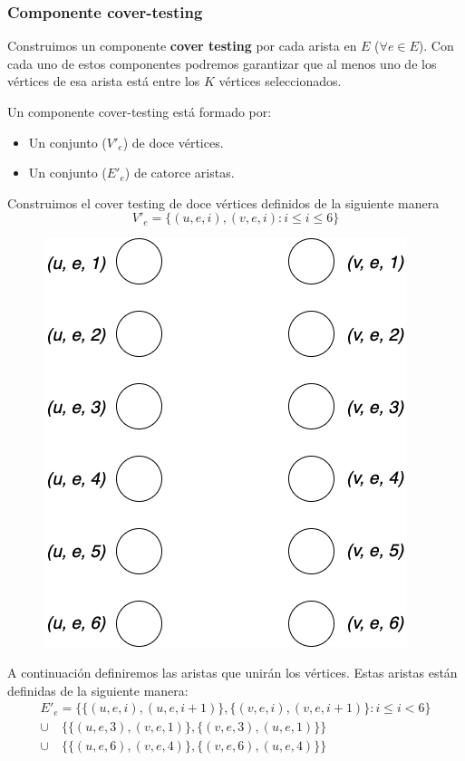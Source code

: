 \documentclass[a4paper]{article}
\begin{document}
\subsubsection{Componente cover-testing}

Construimos un componente \textbf{cover testing} por cada arista en $E$ ($\forall e \in E$). Con cada uno de estos componentes podremos garantizar que al menos uno de los vértices de esa arista está entre los $K$ vértices seleccionados.

Un componente cover-testing está formado por:
\begin{itemize}
    \item Un conjunto ($V'_e$) de doce vértices.
    \item Un conjunto ($E'_e$) de catorce aristas.
\end{itemize}

Construimos el cover testing de doce vértices definidos de la siguiente manera
\[V'_e = \{(u, e, i),(v,e,i) : i \le i \le 6\}\]

\begin{figure}[ht]
\centering
\includegraphics[scale=0.3]{images/cover-testing-1.png}
\end{figure}

A continuación definiremos las aristas que unirán los vértices. Estas aristas están definidas de la siguiente manera:
\begin{align*}
    E'_e = \{\{(u,e,i), (u,e, i+1)\},\{(v,e,i),(v,e,i+1)\} : i \le i < 6\} \\
    \cup \quad \{\{(u,e,3), (v,e,1)\},\{(v,e,3),(u,e,1)\}\} \\
    \cup \quad \{\{(u,e,6), (v,e,4)\},\{(v,e,6),(u,e,4)\}\}
\end{align*}
\end{document}
